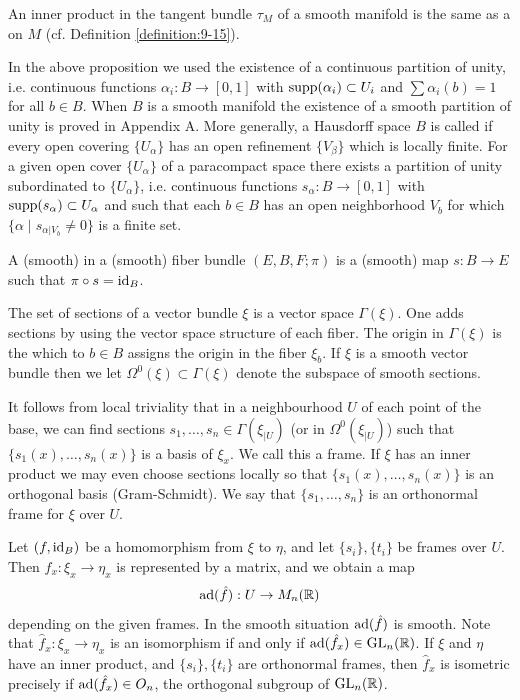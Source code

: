 An inner product in the tangent bundle $\tau_M$ of a smooth manifold is the same as
a  on $M$ (cf. Definition \ref{definition:9-15}).

\begin{remark}\label{remark:15-14}
  In the above proposition we used the existence of a continuous
  partition of unity, i.e. continuous functions $\alpha_i:B\to [0, 1]$ with $\operatorname{supp}(\alpha_i)\subset U_i$
  and $\sum\alpha_i(b)=1$ for all $b\in B$. When $B$ is a smooth manifold the existence
  of a smooth partition of unity is proved in Appendix A. More generally, a
  Hausdorff space $B$ is called  if every open covering $\{U_\alpha\}$ has an
  open refinement $\{V_\beta\}$ which is locally finite. For a given open cover $\{U_\alpha\}$ of
  a paracompact space there exists a partition of unity subordinated to $\{U_\alpha\}$, i.e.
  continuous functions $s_\alpha:B\to [0,1]$ with $\operatorname{supp}(s_\alpha)\subset U_\alpha$ and such that each 
  $b\in B$ has an open neighborhood $V_b$ for which $\{\alpha\mid s_{\alpha|V_b}\neq 0\}$ is a finite set.
\end{remark}

\begin{definition}\label{definition:15-15}
  A (smooth)  in a (smooth) fiber bundle $(E, B, F;\pi)$ is a (smooth) map $s:B\to E$ 
  such that $\pi\circ s = \operatorname{id}_B$.
\end{definition}

The set of sections of a vector bundle $\xi$ is a vector space $\Gamma(\xi)$. One adds sections
by using the vector space structure of each fiber. The origin in $\Gamma(\xi)$ is the 
which to $b\in B$ assigns the origin in the fiber $\xi_b$. If $\xi$ is a smooth vector
bundle then we let $\Omega^0(\xi)\subset\Gamma(\xi)$ denote the subspace of smooth sections.


It follows from local triviality that in a neighbourhood $U$ of each point of
the base, we can find sections $s_1,\ldots,s_n\in\Gamma(\xi_{|U})$ (or in $\Omega^0(\xi_{|U})$) 
such that $\{s_1(x), \ldots, s_n(x)\}$ is a basis of $\xi_x$. We call this a frame. If $\xi$ 
has an inner product we may even choose sections locally so that $\{s_1(x), \ldots, s_n(x)\}$ is an
orthogonal basis (Gram-Schmidt). We say that $\{s_1, \ldots, s_n\}$ is an orthonormal
frame for $\xi$ over $U$.

Let $(f, \operatorname{id}_B)$ be a homomorphism from $\xi$ to $\eta$, and let $\{s_i\}, \{t_i\}$ be frames over
$U$. Then $\hat f_x:\xi_x\to \eta_x$ is represented by a matrix, and we obtain a map
\begin{align}\label{eq:15-1}
  \mathrm{ad}(\hat f):U\to M_n({\mathbb{R}})
\end{align}
depending on the given frames. In the smooth situation $\mathrm{ad}(\hat f)$ is smooth. Note
that $\hat f_x:\xi_x\to \eta_x$ is an isomorphism if and only if $\mathrm{ad}(\hat f_x)\in \mathrm{GL}_n({\mathbb{R}})$. 
If $\xi$ and $\eta$ have an inner product, and $\{s_i\}, \{t_i\}$ are orthonormal frames, then $\hat f_x$ 
is isometric precisely if $\mathrm{ad}(\hat f_x)\in O_n$, the orthogonal subgroup of $\mathrm{GL}_n({\mathbb{R}})$.

